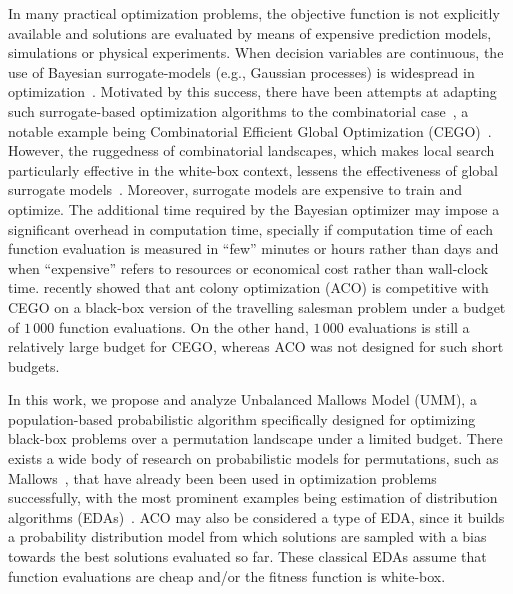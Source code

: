\documentclass[runningheads]{llncs}
\begin{document}
In many practical optimization problems, the objective function is not
explicitly available and solutions are evaluated by means of expensive
prediction models, simulations or physical experiments. When decision variables
are continuous, the use of Bayesian surrogate-models (e.g., Gaussian processes)
is widespread in
optimization~\citep{JonSchWel98go,ForKea2009surrogate}. Motivated by this
success, there have been attempts at adapting such surrogate-based optimization
algorithms to the combinatorial case~\cite{MorKat2011:evo}, a notable example being Combinatorial
Efficient Global Optimization
(CEGO)~\citep{ZaeStoBar2014:ppsn,ZaeStoFriFisNauBar2014}. However, the
ruggedness of combinatorial landscapes, which makes local search particularly
effective in the white-box context, lessens the effectiveness of global
surrogate models~\citep{EriPeaGar2019scalable}. Moreover, surrogate models are
expensive to train and optimize. The additional time required by the Bayesian
optimizer may impose a significant overhead in computation time, specially if
computation time of each function evaluation is measured in ``few'' minutes or
hours rather than days and when ``expensive'' refers to resources or economical
cost rather than wall-clock time. \citet{PerLopStu2015si} recently showed that
ant colony optimization (ACO) %
is competitive with CEGO
on a black-box version of the travelling salesman problem under a budget of
$1\,000$ function evaluations.  On the other hand, $1\,000$ evaluations is
still a relatively large budget for CEGO, whereas ACO was not designed for such
short budgets.


In this work, we propose and analyze Unbalanced Mallows Model (UMM), a
population-based probabilistic algorithm specifically designed for optimizing
black-box problems over a permutation landscape under a limited budget. There
exists a wide body of research on probabilistic models for permutations, such
as Mallows~\cite{FliVer1986}, that have already been been used in optimization
problems successfully, with the most prominent examples being estimation of
distribution algorithms
(EDAs)~\cite{CebIruMen2014eda,CebMenLoz2015mallows}. ACO may also be considered
a type of EDA, since it builds a probability distribution model from which
solutions are sampled with a bias towards the best solutions evaluated so
far. These classical EDAs  assume that function
evaluations are cheap and/or the fitness function is white-box.
\end{document}
